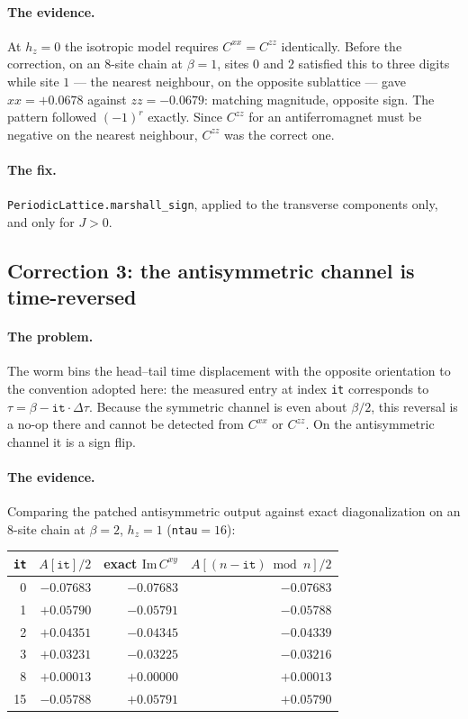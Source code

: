 \documentclass[11pt,a4paper]{article}
\newcommand{\code}[1]{\texttt{#1}}
\begin{document}
\paragraph{The evidence.} At $h_z=0$ the isotropic model requires
$C^{xx}=C^{zz}$ identically. Before the correction, on an 8-site chain at
$\beta=1$, sites $0$ and $2$ satisfied this to three digits while site $1$ ---
the nearest neighbour, on the opposite sublattice --- gave $xx=+0.0678$ against
$zz=-0.0679$: matching magnitude, opposite sign. The pattern followed
$(-1)^{r}$ exactly. Since $C^{zz}$ for an antiferromagnet must be negative on
the nearest neighbour, $C^{zz}$ was the correct one.

\paragraph{The fix.} \code{PeriodicLattice.marshall\_sign}, applied to the
transverse components only, and only for $J>0$.

\subsection{Correction 3: the antisymmetric channel is time-reversed}

\paragraph{The problem.} The worm bins the head--tail time displacement with the
opposite orientation to the convention adopted here: the measured entry at index
\code{it} corresponds to $\tau = \beta - \code{it}\cdot\Delta\tau$. Because the
symmetric channel is even about $\beta/2$, this reversal is a no-op there and
cannot be detected from $C^{xx}$ or $C^{zz}$. On the antisymmetric channel it is
a sign flip.

\paragraph{The evidence.} Comparing the patched antisymmetric output against
exact diagonalization on an 8-site chain at $\beta=2$, $h_z=1$
(\code{ntau}$=16$):

\begin{center}
\begin{tabular}{rrrr}
\toprule
\code{it} & $A[\code{it}]/2$ & exact $\mathrm{Im}\,C^{xy}$ & $A[(n-\code{it})\bmod n]/2$ \\
\midrule
 0 & $-0.07683$ & $-0.07683$ & $-0.07683$ \\
 1 & $+0.05790$ & $-0.05791$ & $-0.05788$ \\
 2 & $+0.04351$ & $-0.04345$ & $-0.04339$ \\
 3 & $+0.03231$ & $-0.03225$ & $-0.03216$ \\
 8 & $+0.00013$ & $+0.00000$ & $+0.00013$ \\
15 & $-0.05788$ & $+0.05791$ & $+0.05790$ \\
\bottomrule
\end{tabular}
\end{center}
\end{document}
